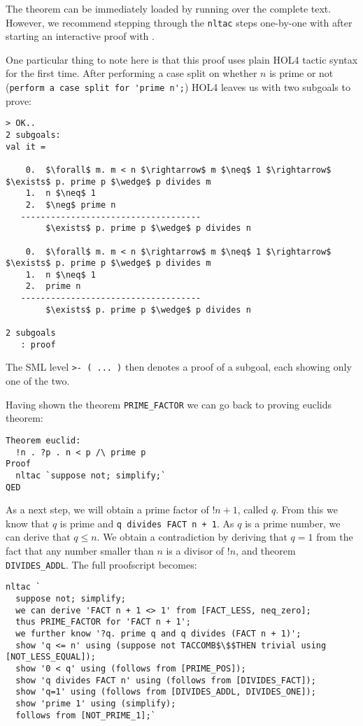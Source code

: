 The theorem can be immediately loaded by running  over the complete
text.
However, we recommend stepping through the \lstinline{nltac} steps one-by-one
with  after starting an interactive proof with .

One particular thing to note here is that this proof uses plain HOL4 tactic
syntax for the first time.
After performing a case split on whether $n$ is prime or not
(\lstinline{perform a case split for 'prime n';}) HOL4 leaves us with two
subgoals to prove:

\begin{lstlisting}[frame=single]
> OK..
2 subgoals:
val it =

    0.  $\forall$ m. m < n $\rightarrow$ m $\neq$ 1 $\rightarrow$ $\exists$ p. prime p $\wedge$ p divides m
    1.  n $\neq$ 1
    2.  $\neg$ prime n
   ------------------------------------
        $\exists$ p. prime p $\wedge$ p divides n

    0.  $\forall$ m. m < n $\rightarrow$ m $\neq$ 1 $\rightarrow$ $\exists$ p. prime p $\wedge$ p divides m
    1.  n $\neq$ 1
    2.  prime n
   ------------------------------------
        $\exists$ p. prime p $\wedge$ p divides n

2 subgoals
   : proof
\end{lstlisting}

The SML level \lstinline{>- ( ... )} then denotes a proof of a subgoal, each
showing only one of the two.

Having shown the theorem \lstinline{PRIME_FACTOR} we can go back to proving
euclids theorem:
\begin{lstlisting}
Theorem euclid:
  !n . ?p . n < p /\ prime p
Proof
  nltac `suppose not; simplify;`
QED
\end{lstlisting}

As a next step, we will obtain a prime factor of $!n + 1$, called $q$.
From this we know that $q$ is prime and \lstinline{q divides FACT n + 1}.
As $q$ is a prime number, we can derive that $q \leq n$.
We obtain a contradiction by deriving that $q = 1$ from the fact that any number
smaller than $n$ is a divisor of $!n$, and theorem \lstinline{DIVIDES_ADDL}.
The full proofscript becomes:
\begin{lstlisting}[mathescape=true]
nltac `
  suppose not; simplify;
  we can derive 'FACT n + 1 <> 1' from [FACT_LESS, neq_zero];
  thus PRIME_FACTOR for 'FACT n + 1';
  we further know '?q. prime q and q divides (FACT n + 1)';
  show 'q <= n' using (suppose not TACCOMB$\$$THEN trivial using [NOT_LESS_EQUAL]);
  show '0 < q' using (follows from [PRIME_POS]);
  show 'q divides FACT n' using (follows from [DIVIDES_FACT]);
  show 'q=1' using (follows from [DIVIDES_ADDL, DIVIDES_ONE]);
  show 'prime 1' using (simplify);
  follows from [NOT_PRIME_1];`
\end{lstlisting}

